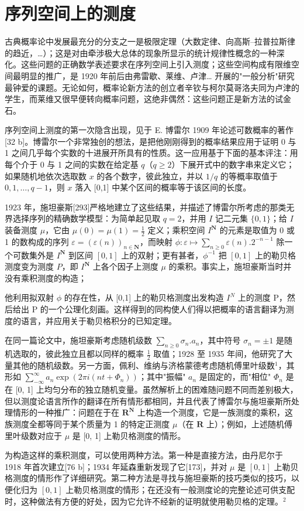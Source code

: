 \section*{序列空间上的测度}
{}

古典概率论中发展最充分的分支之一是极限定理（大数定律、向高斯–拉普拉斯律的趋近，\ldots）；这是对由牵涉极大总体的现象所显示的统计规律性概念的一种深化。这些问题的正确数学表述要求在序列空间上引入测度；这些空间构成有限维空间最明显的推广，是 1920 年前后由弗雷歇、莱维、卢津\ldots{} 开展的"一般分析"研究最钟爱的课题。无论如何，概率论新方法的创立者辛钦与柯尔莫哥洛夫同为卢津的学生，而莱维又很早便转向概率问题，这绝非偶然：这些问题正是新方法的试金石。

序列空间上测度的第一次隐含出现，见于 E. 博雷尔 1909 年论述可数概率的著作{[}32 b{]}。博雷尔一个非常独创的想法，是把他刚刚得到的概率结果应用于证明 0 与 1 之间几乎每个实数的十进展开所具有的性质。这一应用基于下面的基本评注：用每个介于 0 与 1 之间的实数在给定基 \(q\)（\(q \geq 2\)）下展开式中的数字串来定义它；如果随机地依次选取数 \(x\) 的各个数字，彼此独立，并以 \(1/q\) 的等概率取值于 \(0,1,\ldots,q-1\)，则 \(x\) 落入 [0,1] 中某个区间的概率等于该区间的长度。

1923 年，施坦豪斯{[}293{]}严格地建立了这些结果，并描述了博雷尔所考虑的那类无界选择序列的精确数学模型：为简单起见取 \(q = 2\)，并用 \(I\) 记二元集 \(\{0,1\}\)；给 \(I\) 装备测度 \(\mu\)，它由 \(\mu(0) = \mu(1) = \frac{1}{2}\) 定义；乘积空间 \(I^{\mathbf{N}}\) 的元素是取值为 0 或 1 的数构成的序列 \(\varepsilon = (\varepsilon(n))_{n \in \mathbf{N}}\)，而映射 \(\phi : \varepsilon \mapsto \sum_{n \geq 0} \varepsilon(n). 2^{-n-1}\) 除一个可数集外是 \(I^{\mathbf{N}}\) 到区间 \([0,1]\) 上的双射；更有甚者，\(\phi^{-1}\) 把 \([0,1]\) 上的勒贝格测度变为测度 \(P\)，即 \(I^{\mathbf{N}}\) 上各个因子上测度 \(\mu\) 的乘积。事实上，施坦豪斯当时并没有乘积测度的构造；

他利用拟双射 \(\phi\) 的存在性，从 [0,1] 上的勒贝格测度出发构造 \(I^{N}\) 上的测度 P，然后给出 P 的一个公理化刻画。这样得到的同构使人们得以把概率的语言翻译为测度的语言，并应用关于勒贝格积分的已知定理。

在同一篇论文中，施坦豪斯考虑随机级数 \(\sum_{n\geq 0}\sigma_n.a_n\)，其中符号 \(\sigma_{n} = \pm 1\) 是随机选取的，彼此独立且都以同样的概率 \(\frac{1}{2}\) 取值；1928 至 1935 年间，他研究了大量其他的随机级数。另一方面，佩利、维纳与济格蒙德考虑随机傅里叶级数\(^{1}\)，其形如 \(\sum_{-\infty}^{\infty}a_n\exp (2\pi i(nt + \varPhi_n))\)；其中"振幅" \(a_{n}\) 是固定的，而"相位" \(\varPhi_{n}\) 是在 [0, 1] 上均匀分布的独立随机变量。虽然解析上的困难随问题不同而差别极大，但以测度论语言所作的翻译在所有情形都相同，并且代表了博雷尔与施坦豪斯所处理情形的一种推广：问题在于在 \(\mathbf{R}^{\mathbf{N}}\) 上构造一个测度，它是一族测度的乘积，这族测度全都等同于某个质量为 1 的特定正测度 \(\mu\)（在 \(\mathbf{R}\) 上）；例如，上述随机傅里叶级数对应于 \(\mu\) 是 [0, 1] 上勒贝格测度的情形。

为构造这样的乘积测度，可以使用两种方法。第一种是直接方法，由丹尼尔于 1918 年首次建立{[}76 b{]}；1934 年延森重新发现了它{[}173{]}，并对 \(\mu\) 是 \([0,1]\) 上勒贝格测度的情形作了详细研究。第二种方法是寻找与施坦豪斯的技巧类似的技巧，以便化归为 \([0,1]\) 上勒贝格测度的情形；在还没有一般测度论的完整论述可供支配时，这种做法有方便的好处，因为它允许不经新的证明就使用勒贝格的定理。\(^{2}\)

